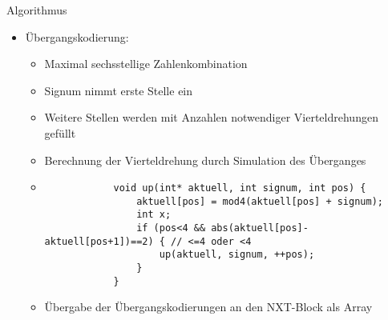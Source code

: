 \documentclass{beamer}
\begin{document}
\begin{frame}[fragile]{Algorithmus}
\begin{itemize}
	\item Übergangskodierung:
	\begin{itemize}
		\item Maximal sechsstellige Zahlenkombination
		\item Signum nimmt erste Stelle ein
		\item Weitere Stellen werden mit Anzahlen notwendiger Vierteldrehungen gefüllt
		\item Berechnung der Vierteldrehung durch Simulation des Überganges
		\vspace{1em}
		\item {\tiny\begin{verbatim}
			void up(int* aktuell, int signum, int pos) {
			    aktuell[pos] = mod4(aktuell[pos] + signum);
			    int x;
			    if (pos<4 && abs(aktuell[pos]-aktuell[pos+1])==2) { // <=4 oder <4
			        up(aktuell, signum, ++pos);
			    }
			}
		\end{verbatim}
		}
		\vspace{1em}
		\item Übergabe der Übergangskodierungen an den NXT-Block als Array 
	\end{itemize}
\end{itemize}
\end{frame}
\end{document}
